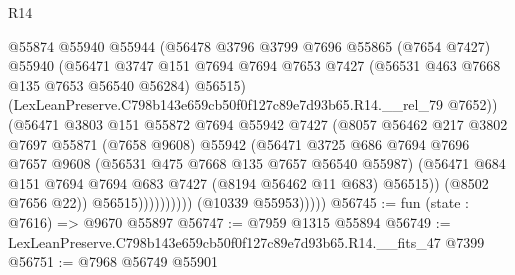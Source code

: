 \begin{lexlean}{R14}
\begin{coremodule}
                              @55874
                              @55940
                              @55944
                              (@56478
                                @3796
                                @3799
                                @7696
                                @55865
                                (@7654 @7427)
                                @55940
                                (@56471
                                  @3747
                                  @151
                                  @7694
                                  @7694
                                  @7653
                                  @7427
                                  (@56531 @463 @7668 @135 @7653 @56540 @56284)
                                  @56515)
                                (LexLeanPreserve.C798b143e659cb50f0f127c89e7d93b65.R14.__rel_79
                                  @7652))
                              (@56471
                                @3803
                                @151
                                @55872
                                @7694
                                @55942
                                @7427
                                (@8057
                                  @56462
                                  @217
                                  @3802
                                  @7697
                                  @55871
                                  (@7658 @9608)
                                  @55942
                                  (@56471
                                    @3725
                                    @686
                                    @7694
                                    @7696
                                    @7657
                                    @9608
                                    (@56531 @475 @7668 @135 @7657 @56540 @55987)
                                    (@56471
                                      @684
                                      @151
                                      @7694
                                      @7694
                                      @683
                                      @7427
                                      (@8194 @56462 @11 @683)
                                      @56515))
                                  (@8502 @7656 @22))
                                @56515))))))))))
            (@10339 @55953)))))
@56745 := fun (state : @7616) => @9670 @55897
@56747 := @7959 @1315 @55894
@56749 := LexLeanPreserve.C798b143e659cb50f0f127c89e7d93b65.R14.__fits_47 @7399
@56751 := @7968 @56749 @55901

\end{coremodule}
\end{lexlean}
